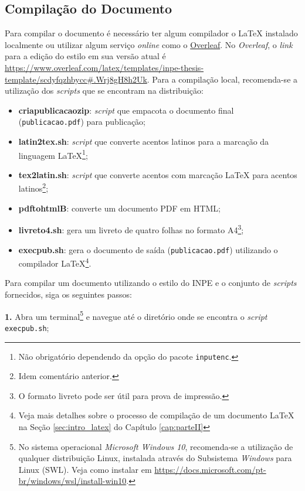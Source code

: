 \subsection{Compilação do Documento}
\label{sec:compilacao}

Para compilar o documento é necessário ter algum compilador o \LaTeX{} instalado localmente ou utilizar algum serviço \textit{online} como o \href{https://www.overleaf.com/}{Overleaf}. No \textit{Overleaf}, o \textit{link} para a edição do estilo em sua versão atual é \url{https://www.overleaf.com/latex/templates/inpe-thesis-template/scdyfqzhbycc#.Wrj8gH8h2Uk}. Para a compilação local, recomenda-se a utilização dos \textit{scripts} que se encontram na distribuição:

\begin{itemize}
    \item \textbf{criapublicacaozip}: \textit{script} que empacota o documento final ({\tt publicacao.pdf}) para publicação;
    \item \textbf{latin2tex.sh}: \textit{script} que converte acentos latinos para a marcação da linguagem \LaTeX{}\footnote{Não obrigatório dependendo da opção do pacote {\tt inputenc}.};
    \item \textbf{tex2latin.sh}: \textit{script} que converte acentos com marcação \LaTeX{} para acentos latinos\footnote{Idem comentário anterior.};
    \item \textbf{pdftohtmlB}: converte um documento PDF em HTML;
    \item \textbf{livreto4.sh}: gera um livreto de quatro folhas no formato A4\footnote{O formato livreto pode ser útil para prova de impressão.};
    \item \textbf{execpub.sh}: gera o documento de saída ({\tt publicacao.pdf}) utilizando o compilador \LaTeX{}\footnote{Veja mais detalhes sobre o processo de compilação de um documento \LaTeX{} na Seção \ref{sec:intro_latex} do Capítulo \ref{cap:parteII}}. 
\end{itemize}

Para compilar um documento utilizando o estilo do INPE e o conjunto de \textit{scripts} fornecidos, siga os seguintes passos:

\textbf{1.} Abra um terminal\footnote{No sistema operacional \textit{Microsoft Windows 10}, recomenda-se a utilização de qualquer distribuição Linux, instalada através do Subsistema \textit{Windows} para Linux (SWL). Veja como instalar em \url{https://docs.microsoft.com/pt-br/windows/wsl/install-win10}.} e navegue até o diretório onde se encontra o \textit{script} {\tt execpub.sh};

